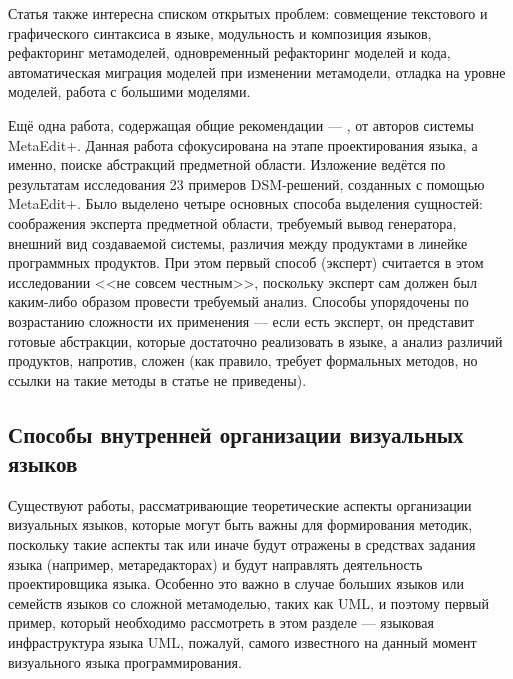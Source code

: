 Статья также интересна списком открытых проблем: совмещение текстового и графического 
синтаксиса в языке, модульность и композиция языков, рефакторинг метамоделей, одновременный 
рефакторинг моделей и кода, автоматическая миграция моделей при изменении метамодели, 
отладка на уровне моделей, работа с большими моделями.

Ещё одна работа, содержащая общие рекомендации --- \cite{luoma2004defining}, от авторов 
системы MetaEdit+. Данная работа сфокусирована на этапе проектирования языка, а именно, 
поиске абстракций предметной области. Изложение ведётся по результатам исследования 
23 примеров \ac{DSM}-решений, созданных с помощью MetaEdit+. Было выделено четыре основных 
способа выделения сущностей: соображения эксперта предметной области, требуемый вывод 
генератора, внешний вид создаваемой системы, различия между продуктами в линейке программных 
продуктов. При этом первый способ (эксперт) считается в этом исследовании <<не совсем 
честным>>, поскольку эксперт сам должен был каким-либо образом провести требуемый 
анализ. Способы упорядочены по возрастанию сложности их применения --- если есть эксперт, 
он представит готовые абстракции, которые достаточно реализовать в языке, а анализ 
различий продуктов, напротив, сложен (как правило, требует формальных методов, но 
ссылки на такие методы в статье не приведены).

\subsection{Способы внутренней организации визуальных языков}
Существуют работы, рассматривающие теоретические аспекты организации визуальных языков, 
которые могут быть важны для формирования методик, поскольку такие аспекты так 
или иначе будут отражены в средствах задания языка (например, метаредакторах) и будут 
направлять деятельность проектировщика языка. Особенно это важно в случае больших 
языков или семейств языков со сложной метамоделью, таких как UML, и поэтому первый 
пример, который необходимо рассмотреть в этом разделе --- языковая инфраструктура 
языка UML, пожалуй, самого известного на данный момент визуального языка программирования.

